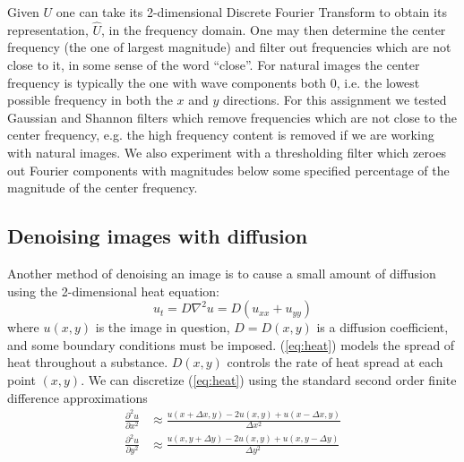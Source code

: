 \documentclass[fleqn,10pt]{../SelfArx} %
\begin{document}
Given $U$ one can take its 2-dimensional Discrete Fourier Transform to obtain its representation, $\hat{U} $, in the frequency domain. One may then determine the center frequency (the one of largest magnitude) and filter out frequencies which are not close to it, in some sense of the word ``close''. For natural images the center frequency is typically the one with wave components both 0, i.e. the lowest possible frequency in both the $x$ and $y$ directions. For this assignment we tested Gaussian and Shannon filters which remove frequencies which are not close to the center frequency, e.g. the high frequency content is removed if we are working with natural images. We also experiment with a thresholding filter which zeroes out Fourier components with magnitudes below some specified percentage of the magnitude of the center frequency.


\subsection{Denoising images with diffusion}
Another method of denoising an image is to cause a small amount of diffusion using the 2-dimensional heat equation:
\begin{equation}\label{eq:heat}
	u_t = D\nabla^2u = D(u_{xx}+u_{yy})
\end{equation}
where $u(x,y)$ is the image in question, $D=D(x,y)$ is a diffusion coefficient, and some boundary conditions must be imposed. (\ref{eq:heat}) models the spread of heat throughout a substance. $D(x,y)$ controls the rate of heat spread at each point $(x,y)$. We can discretize (\ref{eq:heat}) using the standard second order finite difference approximations
\begin{align}\label{eq:fdx}
\frac{\partial^2 u}{\partial x^2} &\approx \frac{u(x+\Delta x,y)-2u(x,y)+u(x-\Delta x,y)}{\Delta x^2} \\
\label{eq:fdy}
\frac{\partial^2 u}{\partial y^2} &\approx \frac{u(x,y+\Delta y)-2u(x,y)+u(x,y-\Delta y)}{\Delta y^2}
\end{align}
\end{document}
